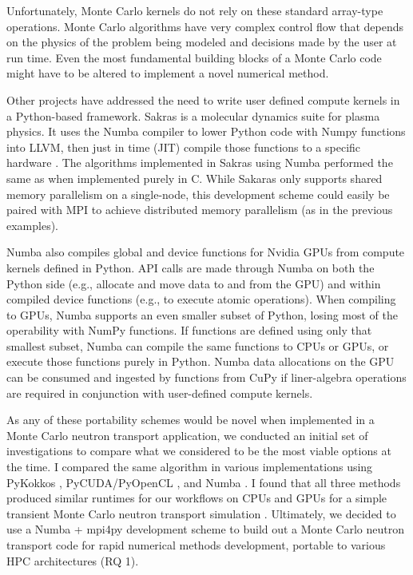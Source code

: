 Unfortunately, Monte Carlo kernels do not rely on these standard array-type operations.
Monte Carlo algorithms have very complex control flow that depends on the physics of the problem being modeled and decisions made by the user at run time. 
Even the most fundamental building blocks of a Monte Carlo code might have to be altered to implement a novel numerical method.

Other projects have addressed the need to write user defined compute kernels in a Python-based framework.
Sakras \cite{silvestri_sarkas_2022} is a molecular dynamics suite for plasma physics. 
It uses the Numba compiler to lower Python code with Numpy functions into LLVM, then just in time (JIT) compile those functions to a specific hardware \cite{lam_numba_2015}. 
The algorithms implemented in Sakras using Numba performed the same as when implemented purely in C.
While Sakaras only supports shared memory parallelism on a single-node, this development scheme could easily be paired with MPI to achieve distributed memory parallelism (as in the previous examples). 

Numba also compiles global and device functions for Nvidia GPUs from compute kernels defined in Python.
API calls are made through Numba on both the Python side (e.g., allocate and move data to and from the GPU) and within compiled device functions (e.g., to execute atomic operations).
When compiling to GPUs, Numba supports an even smaller subset of Python, losing most of the operability with NumPy functions.
If functions are defined using only that smallest subset, Numba can compile the same functions to CPUs or GPUs, or execute those functions purely in Python.
Numba data allocations on the GPU can be consumed and ingested by functions from CuPy if liner-algebra operations are required in conjunction with user-defined compute kernels.


As any of these portability schemes would be novel when implemented in a Monte Carlo neutron transport application, we conducted an initial set of investigations to compare what we considered to be the most viable options at the time. 
I compared the same algorithm in various implementations using PyKokkos \cite{AlAwarETAL21PyKokkos}, PyCUDA/PyOpenCL \cite{kloeckner_pycuda_2012}, and Numba \cite{morgan2022}.
I found that all three methods produced similar runtimes for our workflows on CPUs and GPUs for a simple transient Monte Carlo neutron transport simulation \cite{morgan2022}.
Ultimately, we decided to use a Numba + mpi4py development scheme to build out a Monte Carlo neutron transport code for rapid numerical methods development, portable to various HPC architectures \cite{variansyah_mc23_mcdc,morgan_monte_2024,transport_cement_mcdc_2024} (RQ 1).


